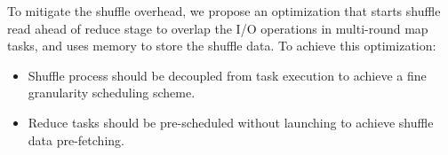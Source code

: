 To mitigate the shuffle overhead, we propose an optimization that starts shuffle read ahead of reduce stage to overlap the I/O operations in multi-round map tasks, and uses memory to store the shuffle data. 
To achieve this optimization:
\begin{itemize}
	\item Shuffle process should be decoupled from task execution to achieve a fine granularity scheduling scheme.
	\item Reduce tasks should be pre-scheduled without launching to achieve shuffle data pre-fetching.
\end{itemize}

